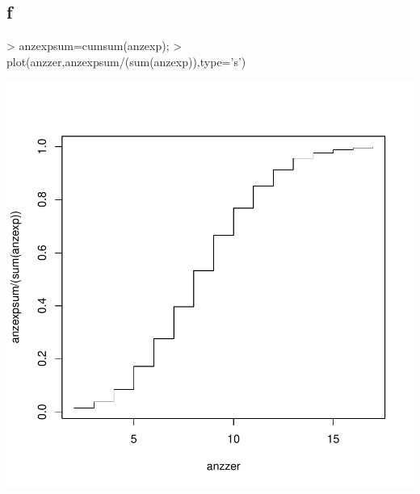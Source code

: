 \subsection{f}
\begin{Schunk}
\begin{Sinput}
> anzexpsum=cumsum(anzexp);
> plot(anzzer,anzexpsum/(sum(anzexp)),type='s')
\end{Sinput}
\end{Schunk}
\includegraphics{sw10_1-007}

